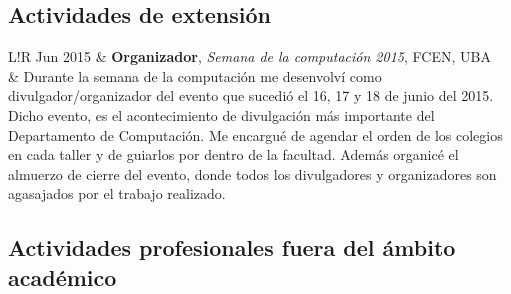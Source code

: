 \documentclass[10pt]{article}
\newcommand\VRule{\color{lightgray}\vrule width 0.5pt}
\begin{document}
\subsection*{Actividades de extensión}

\begin{tabular}{L!{\VRule}R}
Jun 2015 & \textbf{Organizador}, \textit{Semana de la computación 2015}, FCEN, UBA\\
& Durante la semana de la computación me desenvolví como divulgador/organizador del evento que sucedió el 16, 17 y 18 de
junio del 2015. Dicho evento, es el acontecimiento de divulgación más importante del Departamento de Computación. Me encargué de
agendar el orden de los colegios en cada taller y de guiarlos por dentro de la facultad. Además organicé el almuerzo de
cierre del evento, donde todos los divulgadores y organizadores son agasajados por el trabajo realizado.\\

\end{tabular}

\subsection*{Actividades profesionales fuera del ámbito académico}
\end{document}
